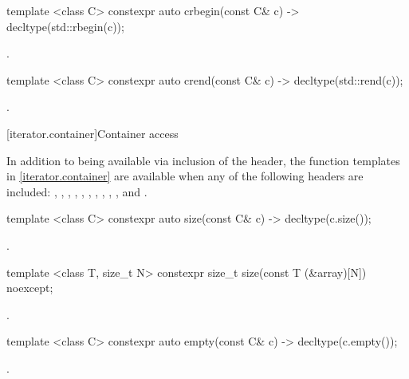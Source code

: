 %
\begin{itemdecl}
template <class C> constexpr auto crbegin(const C& c) -> decltype(std::rbegin(c));
\end{itemdecl}
\begin{itemdescr}
\pnum \returns {}.
\end{itemdescr}

%
\begin{itemdecl}
template <class C> constexpr auto crend(const C& c) -> decltype(std::rend(c));
\end{itemdecl}
\begin{itemdescr}
\pnum \returns {}.
\end{itemdescr}

[iterator.container]{Container access}

\pnum
In addition to being available via inclusion of the  header,
the function templates in \ref{iterator.container} are available
when any of the following headers are included:
, , , ,
, , , ,
, , and .

%
\begin{itemdecl}
template <class C> constexpr auto size(const C& c) -> decltype(c.size());
\end{itemdecl}
\begin{itemdescr}
\pnum \returns {}.
\end{itemdescr}

%
\begin{itemdecl}
template <class T, size_t N> constexpr size_t size(const T (&array)[N]) noexcept;
\end{itemdecl}
\begin{itemdescr}
\pnum \returns {}.
\end{itemdescr}

%
\begin{itemdecl}
template <class C> constexpr auto empty(const C& c) -> decltype(c.empty());
\end{itemdecl}
\begin{itemdescr}
\pnum \returns {}.
\end{itemdescr}

